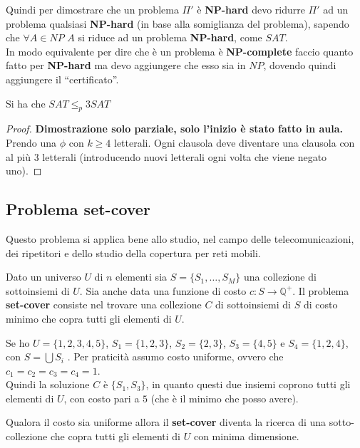 								Quindi per dimostrare che un problema $\Pi'$ è \textbf{NP-hard} devo ridurre
								$\Pi'$ ad un problema qualsiasi \textbf{NP-hard} (in base alla somiglianza del
								problema), sapendo che $\forall A\in NP$ $A$ si riduce ad un problema
								\textbf{NP-hard}, come $SAT$.\\
								In modo equivalente per dire che è un problema è \textbf{NP-complete} faccio
								quanto fatto per \textbf{NP-hard} ma devo aggiungere che esso sia in $NP$,
								dovendo quindi aggiungere il ``certificato''.
								\begin{teorema}
									Si ha che $SAT\leq_p 3SAT$
								\end{teorema}
								\begin{proof}
									\textbf{Dimostrazione solo parziale, solo l'inizio è stato fatto in aula.\\}
										Prendo una $\phi$ con $k\geq 4$ letterali. Ogni clausola deve diventare una
										clausola con al più 3 letterali (introducendo nuovi letterali ogni volta che
										viene negato uno). 
										\end{proof}
										\subsection{Problema set-cover}
										Questo problema si applica bene allo studio, nel campo delle telecomunicazioni,
										dei ripetitori e dello studio della copertura per reti mobili.
										\begin{definizione}
											Dato un universo $U$ di $n$ elementi sia $S=\{S_1,\ldots,S_M\}$ una collezione
											di sottoinsiemi di $U$. Sia anche data una funzione di costo
											$c:S\to\mathbb{Q}^+$. Il problema \textbf{set-cover} consiste nel trovare una
											collezione $C$ di sottoinsiemi di $S$ di costo minimo che copra tutti gli
											elementi di $U$.
										\end{definizione}
										\begin{esempio}
											Se ho $U=\{1,2,3,4,5\}$, $S_1=\{1,2,3\}$, $S_2=\{2,3\}$, $S_3=\{4,5\}$ e
											$S_4=\{1,2,4\}$, con $S=\bigcup S_i$ . Per praticità assumo costo
											uniforme, ovvero che  $c_1=c_2=c_3=c_4=1$.\\
											Quindi la soluzione $C$ è $\{S_1,S_3\}$, in quanto questi due insiemi coprono
											tutti gli elementi di $U$, con costo pari a $5$ (che è il minimo che posso
											avere).
										\end{esempio}
										\begin{definizione}
											Qualora il costo sia uniforme allora il \textbf{set-cover} diventa la ricerca
											di una sotto-collezione che copra tutti gli elementi di $U$ con minima
											dimensione.
										\end{definizione}
																				
